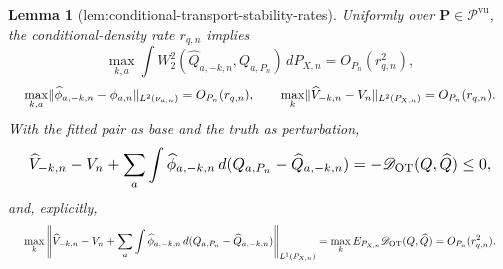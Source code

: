 \documentclass{article}
\newtheorem{lemma}{Lemma}
\begin{document}
\begin{lemma}[lem:conditional-transport-stability-rates]\label{lem:conditional-transport-stability-rates}
Uniformly over \(\mathbf P\in\mathscr P^{\mathrm{vu}}\), the conditional-density rate \(r_{q,n}\) implies
\[
\max_{k,a}\int W_2^2(\widehat Q_{a,-k,n},Q_{a,P_n})\,dP_{X,n}=O_{P_n}(r_{q,n}^2),
\]
\[
\makebox[\linewidth][c]{\resizebox{0.98\linewidth}{!}{\(\displaystyle \max_{k,a}\lVert\widehat\phi_{a,-k,n}-\phi_{a,n}\rVert_{L^2(\nu_{a,n})}=O_{P_n}(r_{q,n}),\qquad
\max_k\lVert\widehat V_{-k,n}-V_n\rVert_{L^2(P_{X,n})}=O_{P_n}(r_{q,n}).\)}}
\]
With the fitted pair as base and the truth as perturbation,
\[
\makebox[\linewidth][c]{\resizebox{0.98\linewidth}{!}{\par\noindent \makebox[\linewidth][c]{\resizebox{0.98\linewidth}{!}{\(\displaystyle \displaystyle \widehat V_{-k,n}-V_n+\sum_a\int\widehat\phi_{a,-k,n}\,d(Q_{a,P_n}-\widehat Q_{a,-k,n})=-\mathscr D_{\mathrm{OT}}(Q,\widehat Q)\le0,\)}}\par\noindent}}
\]
and, explicitly,
\[
\makebox[\linewidth][c]{\resizebox{0.98\linewidth}{!}{\(\displaystyle \max_k\left\|\widehat V_{-k,n}-V_n+\sum_a\int\widehat\phi_{a,-k,n}\,d(Q_{a,P_n}-\widehat Q_{a,-k,n})\right\|_{L^1(P_{X,n})}
=\max_kE_{P_{X,n}}\mathscr D_{\mathrm{OT}}(Q,\widehat Q)=O_{P_n}(r_{q,n}^2).\)}}
\]
\end{lemma}
\end{document}
